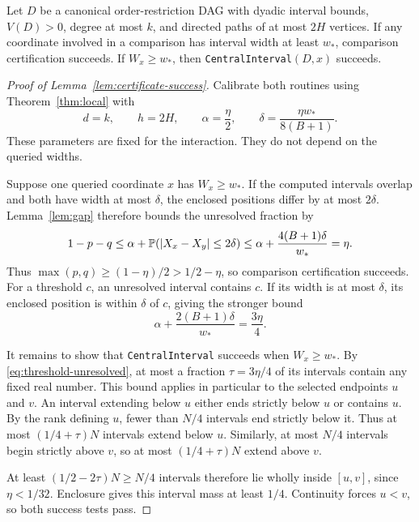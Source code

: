 \begin{lemma}\label{lem:certificate-success}
Let $D$ be a canonical order-restriction DAG with dyadic interval bounds,
$V(D)>0$, degree at most $k$, and directed paths of at most $2H$ vertices.
If any coordinate involved in a comparison has interval width at
least $w_*$, comparison certification succeeds. If $W_x\ge w_*$, then
\textnormal{\texttt{CentralInterval}}$(D,x)$ succeeds.
\end{lemma}

\begin{proof}[Proof of Lemma~\ref{lem:certificate-success}]
Calibrate both routines using
Theorem~\ref{thm:local} with
\begin{equation}\label{eq:estimator-coupling-parameters}
d=k,\qquad h=2H,\qquad
\alpha=\frac\eta2,\qquad
\delta=\frac{\eta w_*}{8(B+1)}.
\end{equation}
These parameters are fixed for the interaction. They do not depend on
the queried widths.

Suppose one queried coordinate $x$ has $W_x\ge w_*$.
If the computed intervals overlap and both have width at most $\delta$,
the enclosed positions differ by at most $2\delta$.
Lemma~\ref{lem:gap} therefore bounds the unresolved fraction by
\[
1-p-q\le\alpha+\mathbb P(|X_x-X_y|\le2\delta)
\le\alpha+\frac{4(B+1)\delta}{w_*}=\eta.
\]
Thus $\max(p,q)\ge(1-\eta)/2>1/2-\eta$, so comparison certification
succeeds. For a threshold $c$, an unresolved interval contains $c$.
If its width is at most $\delta$, its enclosed position is within
$\delta$ of $c$, giving the stronger bound
\begin{equation}\label{eq:threshold-unresolved}
\alpha+\frac{2(B+1)\delta}{w_*}=\frac{3\eta}{4}.
\end{equation}

It remains to show that \texttt{CentralInterval} succeeds when
$W_x\ge w_*$. By \eqref{eq:threshold-unresolved}, at most a fraction
$\tau=3\eta/4$ of its intervals contain any fixed real number.
This bound applies in particular to the selected endpoints $u$ and $v$.
An interval extending below $u$ either ends strictly below $u$ or
contains $u$. By the rank defining $u$, fewer than $N/4$ intervals end
strictly below it. Thus at most $(1/4+\tau)N$ intervals extend below $u$.
Similarly, at most $N/4$ intervals begin strictly above $v$, so at most
$(1/4+\tau)N$ extend above $v$.

At least $(1/2-2\tau)N\ge N/4$ intervals therefore lie wholly inside
$[u,v]$, since $\eta<1/32$. Enclosure gives this interval mass at least
$1/4$. Continuity forces $u<v$, so both success tests pass.
\end{proof}

